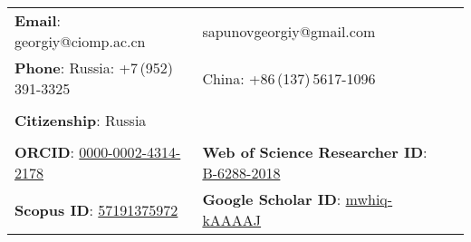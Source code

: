 \documentclass[letterpaper, 11pt]{article}
\begin{document}
	
	
	
	\vspace{0.5cm}
	\begin{center}
		\begin{tabular}{lll}
			\textbf{Email}: georgiy@ciomp.ac.cn & sapunovgeorgiy@gmail.com \\
			\textbf{Phone}: Russia: +7\,(952)\,391-3325 & China: +86\,(137)\,5617-1096 \\
                        \\
			\textbf{Citizenship}: Russia \\

            \\

			\textbf{ORCID}: \href{https://orcid.org/0000-0002-4314-2178}{0000-0002-4314-2178}    &
            \textbf{Web of Science Researcher ID}: \href{https://www.webofscience.com/wos/author/record/B-6288-2018}{B-6288-2018}    \\
            \textbf{Scopus ID}: \href{https://www.scopus.com/authid/detail.uri?authorId=57191375972}{57191375972}    &
            \textbf{Google Scholar ID}: \href{https://orcid.org/0000-0002-4314-2178}{mwhiq-kAAAAJ}
			
		\end{tabular}
	\end{center}
	
	
	\setlength{\tabcolsep}{8pt}
	
\end{document}
